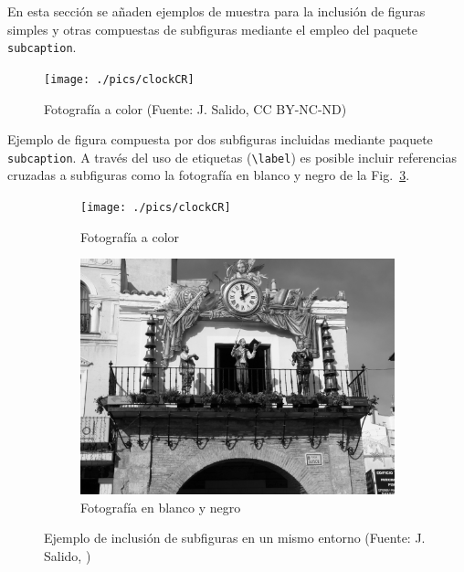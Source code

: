 En esta sección se añaden ejemplos de muestra para la inclusión de 
figuras simples y otras compuestas de subfiguras mediante el empleo del paquete \texttt{subcaption}.

\begin{figure}[H] %
	\centering
	\texttt{[image: ./pics/clockCR]}
	\caption[Ejemplo de figura]{Fotografía a color 
	(Fuente: J. Salido, CC BY-NC-ND)}
	\label{fig:ejFigure}
\end{figure}


\noindent Ejemplo de figura compuesta por dos subfiguras incluidas mediante paquete \texttt{subcaption}. A través del uso de etiquetas (\texttt{\textbackslash label}) es posible incluir referencias cruzadas a subfiguras como la fotografía en blanco y negro de la Fig.~\ref{fig:fotoBW}.


\begin{figure}[H] %
	\centering
	\begin{subfigure}[b]{0.4\linewidth}
		\centering
		\texttt{[image: ./pics/clockCR]}
		\caption{Fotografía a color}\label{fig:fotocolor}
	\end{subfigure} 
	\begin{subfigure}[b]{0.4\linewidth}
		\centering
		\includegraphics[width=0.8\linewidth]{./pics/clockCRbw}
		\caption{Fotografía en blanco y negro}\label{fig:fotoBW}
	\end{subfigure} 
	\caption[Ejemplo de subfiguras]{Ejemplo de inclusión de subfiguras en un mismo entorno (Fuente: J. Salido, \faCreativeCommons{} \faCreativeCommonsBy{} \faCreativeCommonsNcEu{} \faCreativeCommonsNd)}
	\label{fig:ejSubfigures}
\end{figure}

